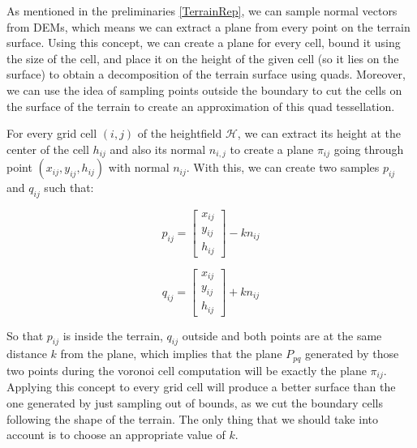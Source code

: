 \vspace{10pt}

As mentioned in the preliminaries \ref{TerrainRep}, we can sample 
normal vectors from DEMs, which means we can extract a plane from every
point on the terrain surface. Using this concept, we can create 
a plane for every cell, bound it using the size of the cell, and place it
on the height of the given cell (so it lies on the surface) to obtain a 
decomposition of the terrain surface using quads. Moreover, we can use 
the idea of sampling points outside the boundary to cut the cells on 
the surface of the terrain to create an approximation of this quad tessellation.

\vspace{10pt}

For every grid cell $(i,j)$ of the heightfield $\mathcal{H}$, we can extract its
height at the center of the cell $h_{ij}$ and also its normal $n_{i,j}$ to 
create a plane $\pi_{ij}$ going through point $(x_{ij}, y_{ij}, h_{ij})$ with normal 
$n_{ij}$. With this, we can create two samples $p_{ij}$ and $q_{ij}$ such that:

\begin{equation}
    p_{ij} = \begin{bmatrix}x_{ij} \\ y_{ij} \\h_{ij}\end{bmatrix} - kn_{ij}
\end{equation}

\begin{equation}
    q_{ij} = \begin{bmatrix}x_{ij} \\ y_{ij} \\h_{ij}\end{bmatrix} + kn_{ij}
\end{equation}

So that $p_{ij}$ is inside the terrain, $q_{ij}$ outside and 
both points are at the same distance $k$ from the plane, which implies that the 
plane $P_{pq}$ generated by those two points during the voronoi cell computation 
will be exactly the plane $\pi_{ij}$. Applying this concept to every grid 
cell will produce a better surface than the one generated by just sampling 
out of bounds, as we cut the boundary cells following the shape of the 
terrain. The only thing that we should take into account is to choose 
an appropriate value of $k$.

\vspace{10pt}

